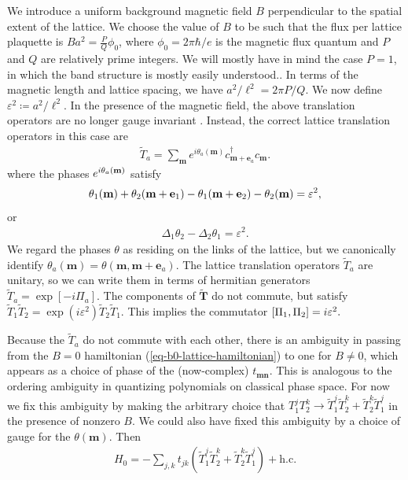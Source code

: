 \documentclass[aps,prb,twocolumn,letterpaper,twoside,nobalancelastpage,groupedaddress,amsmath,amssymb,floatfix,citeautoscript]{revtex4-1}
\begin{document}
We introduce a uniform background magnetic field $B$ perpendicular to the spatial extent of the lattice. We choose the value of $B$ to be such that the flux per lattice plaquette is $Ba^2 = \frac{P}{Q}\phi_0$, where $\phi_0 = 2\pi \hbar /e$ is the magnetic flux quantum and $P$ and $Q$ are relatively prime integers. We will mostly have in mind the case $P =1$, in which the band structure is mostly easily understood.\cite{Harper:2014vi}. In terms of the magnetic length and lattice spacing, we have $a^2/\ell^2 = 2 \pi P/Q$. We now define $\varepsilon^2 \coloneqq a^2/\ell^2$. In the presence of the magnetic field, the above translation operators are no longer gauge invariant \cite{fradkin_field_2013}. Instead, the correct lattice translation operators in this case are
\begin{align*}
\widetilde{T}_a = \sum_{\mathbf{m}} e^{i\theta_a(\mathbf{m})} c^{\dag}_{\mathbf{m} + \mathbf{e}_a}c_{\mathbf{m}}.
\end{align*}
where the phases $e^{i\theta_a(\mathbf{m})}$ satisfy 
\begin{align*}
\theta_1(\mathbf{m}) + \theta_2(\mathbf{m} + \mathbf{e}_1) - \theta_1(\mathbf{m} + \mathbf{e}_2) - \theta_2(\mathbf{m}) = \varepsilon^2,
\end{align*}
or
\begin{align*}
\Delta_1\theta_2 - \Delta_2\theta_1 = \varepsilon^2.
\end{align*}
We regard the phases $\theta$ as residing on the links of the lattice, but we canonically identify $\theta_a(\mathbf{m}) = \theta(\mathbf{m},\mathbf{m}+\mathbf{e}_a)$.
The lattice translation operators $\widetilde{T}_a$ are unitary, so we can write them in terms of hermitian generators $\widetilde{T}_a = \exp\left[-i \Pi_a\right]$. The components of $\widetilde{\mathbf{T}}$ do not commute, but satisfy $\widetilde{T}_1 \widetilde{T}_2 = \exp(i\varepsilon^2) \widetilde{T}_2 \widetilde{T}_1 $. This implies the commutator
$\comm{\Pi_1}{\Pi_2} = i \varepsilon^2.$


Because the $\widetilde{T}_a$ do not commute with each other, there is an ambiguity in passing from the $B=0$ hamiltonian (\ref{eq-b0-lattice-hamiltonian}) to one for $B\neq0$, which appears as a choice of phase of the (now-complex) $t_{\mathbf{m}\mathbf{n}}$. This is analogous to the ordering ambiguity in quantizing polynomials on classical phase space. For now we fix this ambiguity by making the arbitrary choice that $T_1^j T_2^k \rightarrow \widetilde{T}_1^j \widetilde{T}_2^k + \widetilde{T}_2^k\widetilde{T}_1^j$ in the presence of nonzero $B$. We could also have fixed this ambiguity by a choice of gauge for the $\theta(\mathbf{m})$. Then
\begin{align*}
H_0 = -\sum_{j,k} t_{jk}\left(\widetilde{T}_1^j \widetilde{T}_2^k + \widetilde{T}_2^k\widetilde{T}_1^j\right) + \text{h.c.}
\end{align*}
\end{document}
